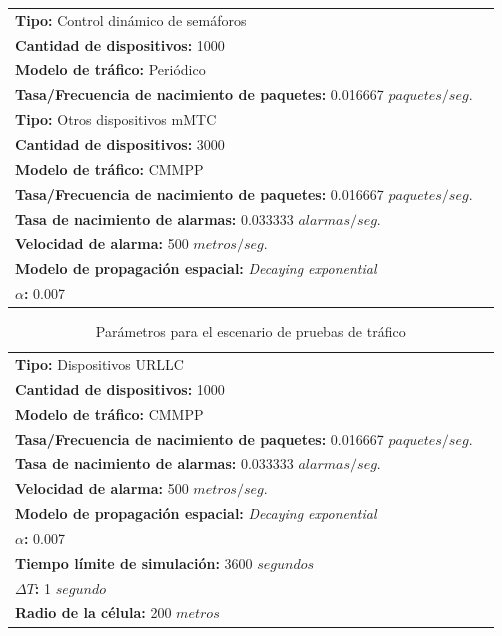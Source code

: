 \begin{table}
\begin{tabular}{|m{16cm}|p{20cm}|}
        \textbf{Tipo:} Control dinámico de semáforos\\ \textbf{Cantidad de dispositivos:} 1000 \\ \textbf{Modelo de tráfico:} Periódico \\ \textbf{Tasa/Frecuencia de nacimiento de paquetes:} 0.016667  $paquetes/seg$. \\ \hline
        \textbf{Tipo:} Otros dispositivos mMTC\\ \textbf{Cantidad de dispositivos:} 3000 \\ \textbf{Modelo de tráfico:} CMMPP \\ \textbf{Tasa/Frecuencia de nacimiento de paquetes:} 0.016667  $paquetes/seg$. \\ \textbf{Tasa de nacimiento de alarmas:} 0.033333 $alarmas/seg$. \\ \textbf{Velocidad de alarma:} 500 $metros/seg$. \\ \textbf{Modelo de propagación espacial:} \textit{Decaying exponential} \\ \textbf{$\alpha$:} 0.007  \\ \hline
        
    \end{tabular}
\end{table}

\begin{table}
    \caption{Parámetros para el escenario de pruebas de tráfico}
    \label{tab:paramPruebaTrafico2}
    \centering
    \begin{tabular}{|m{16cm}|p{20cm}|} \\ 
        \textbf{Tipo:} Dispositivos URLLC \\ \textbf{Cantidad de dispositivos:} 1000 \\ \textbf{Modelo de tráfico:} CMMPP \\ \textbf{Tasa/Frecuencia de nacimiento de paquetes:} 0.016667  $paquetes/seg$. \\ \textbf{Tasa de nacimiento de alarmas:} 0.033333 $alarmas/seg$. \\ \textbf{Velocidad de alarma:} 500 $metros/seg$. \\ \textbf{Modelo de propagación espacial:} \textit{Decaying exponential} \\ \textbf{$\alpha$:} 0.007  \\ \hline
        \textbf{Tiempo límite de simulación:} 3600 $segundos$ \\ \textbf{$\Delta T$:} 1 $segundo$ \\ \textbf{Radio de la célula:} 200 $metros$ \\ \hline
    \end{tabular}
\end{table}

